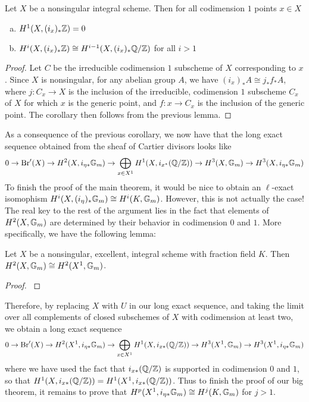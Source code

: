 \begin{cor}
Let $X$ be a nonsingular integral scheme.  Then for all codimension $1$ points $x\in X$
\begin{enumerate}[(a)]
\item  $H^1(X,(i_x)_*\mathbb{Z}) = 0$
\item  $H^i(X,(i_x)_*\mathbb{Z}) \cong H^{i-1}(X,(i_x)_*\mathbb{Q}/\mathbb{Z})$ for all $i>1$
\end{enumerate}
\end{cor}
\begin{proof}
Let $C$ be the irreducible codimension $1$ subscheme of $X$ corresponding to $x$.  Since $X$ is nonsingular, for any abelian group $A$, we have $(i_x)_*A \cong j_*f_*A$, where $j: C_x\rightarrow X$ is the inclusion of the irreducible, codimension $1$ subscheme $C_x$ of $X$ for which $x$ is the generic point, and $f: x\rightarrow C_x$ is the inclusion of the generic point.  The corollary then follows from the previous lemma.
\end{proof}
As a consequence of the previous corollary, we now have that the long exact sequence obtained from the sheaf of Cartier divisors looks like
\begin{equation}\label{les form2}
0\rightarrow \textnormal{Br}'(X)\rightarrow H^2(X,i_{\eta*}\mathbb{G}_m)\rightarrow \bigoplus_{x\in X^1}H^1(X, i_{x^*}(\mathbb{Q}/\mathbb{Z}))\rightarrow H^3(X,\mathbb{G}_m)\rightarrow H^3(X,i_{\eta*}\mathbb{G}_m)
\end{equation}
To finish the proof of the main theorem, it would be nice to obtain an $\ell$-exact isomophism $H^i(X,(i_\eta)_*\mathbb{G}_m)\cong H^i(K,\mathbb{G}_m)$.  However, this is not actually the case!  The real key to the rest of the argument lies in the fact that elements of $H^2(X,\mathbb{G}_m)$ are determined by their behavior in codimension $0$ and $1$.  More specifically, we have the following lemma:
\begin{lem}
Let $X$ be a nonsingular, excellent, integral scheme with fraction field $K$.  Then $H^2(X,\mathbb{G}_m)\cong H^2(X^1,\mathbb{G}_m)$.
\end{lem}
\begin{proof}
\cite{Artin&deJong}
\end{proof}
Therefore, by replacing $X$ with $U$ in our long exact sequence, and taking the limit over all complements of closed subschemes of $X$ with codimension at least two, we obtain a long exact sequence
\begin{equation}\label{les form3}
0\rightarrow \textnormal{Br}'(X)\rightarrow H^2(X^1,i_{\eta*}\mathbb{G}_m)\rightarrow \bigoplus_{x\in X^1}H^1(X, i_{x*}(\mathbb{Q}/\mathbb{Z}))\rightarrow H^3(X^1,\mathbb{G}_m)\rightarrow H^3(X^1,i_{\eta*}\mathbb{G}_m)
\end{equation}
where we have used the fact that $i_{x*}(\mathbb{Q}/\mathbb{Z})$ is supported in codimension $0$ and $1$, so that $H^1(X,i_{x*}(\mathbb{Q}/\mathbb{Z})) = H^1(X^1,i_{x*}(\mathbb{Q}/\mathbb{Z}))$.  Thus to finish the proof of our big theorem, it remains to prove that $H^p(X^1,i_{\eta*}\mathbb{G}_m)\cong H^j(K,\mathbb{G}_m)$ for $j>1$.

